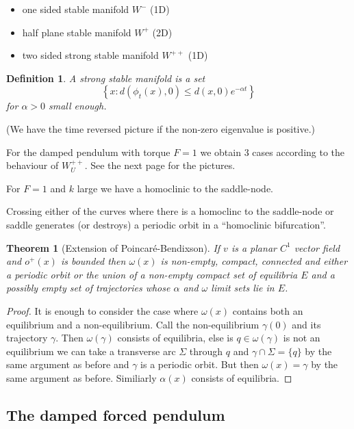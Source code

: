 \documentclass{notes}
\theoremstyle{plain}
\newtheorem*{theorem}{Theorem}
\newtheorem*{definition}{Definition}
\begin{document}
\begin{itemize}
\item one sided stable manifold $W^-$ (1D)
\item half plane stable manifold $W^+$ (2D)
\item two sided strong stable manifold $W^{++}$ (1D)
\end{itemize}

\begin{definition}
A strong stable manifold is a set
\[
\left\{
x : d(\phi_t(x),0) \le d(x,0) e^{-\alpha t}
\right\}
\]
for $\alpha > 0$ small enough.
\end{definition}

(We have the time reversed picture if the non-zero eigenvalue is positive.)

For the damped pendulum with torque $F=1$ we obtain 3 cases according to
the behaviour of $W^{++}_U$.  See the next page for the pictures.

For $F=1$ and $k$ large we have a homoclinic to the saddle-node.
\vspace{1.5in}

Crossing either of the curves where there is a homoclinc to the saddle-node
or saddle generates (or destroys) a periodic orbit in a ``homoclinic
bifurcation''.

\begin{theorem}[Extension of Poincar\'e-Bendixson]
If $v$ is a planar $C^1$ vector field and $o^+(x)$ is bounded then
$\omega(x)$ is non-empty, compact, connected and either a periodic orbit
or the union of a non-empty compact set of equilibria $E$ and a possibly
empty set of trajectories whose $\alpha$ and $\omega$ limit sets lie in
$E$.
\end{theorem}

\begin{proof}
It is enough to consider the case where $\omega(x)$ contains both an
equilibrium and a non-equilibrium.  Call the non-equilibrium $\gamma(0)$
and its trajectory $\gamma$.  Then $\omega(\gamma)$ consists of
equilibria, else is $q \in \omega(\gamma)$ is not an equilibrium we can take
a transverse arc $\Sigma$ through $q$ and $\gamma \cap \Sigma = \{q\}$ by
the same argument as before and $\gamma$ is a periodic orbit.  But then
$\omega(x) = \gamma$ by the same argument as before.  Similiarly $\alpha(x)$
consists of equilibria.
\end{proof}

\newpage
\subsection*{The damped forced pendulum}
\newpage
\end{document}
